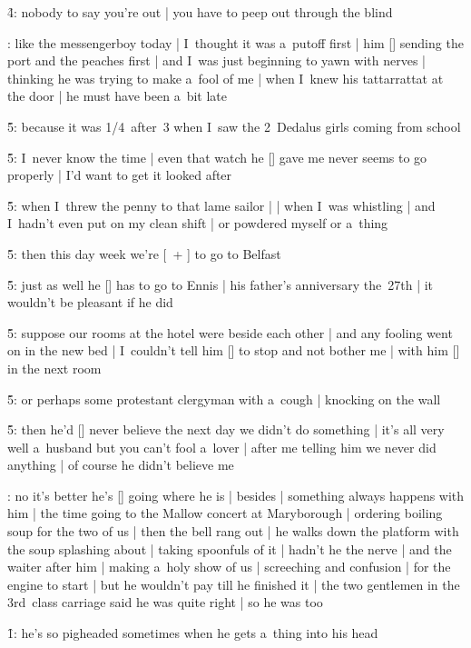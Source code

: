 \f4:
nobody to say you're out |
you have to peep out through the blind

:
like the messengerboy today |
I~thought it was a~putoff first |
him [\boylan] sending the port and the peaches first |
and I~was just beginning to yawn with nerves |
thinking he was trying to make a~fool of me |
when I~knew his tattarrattat at the door |
he must have been a~bit late

\f5:
because it was 1/4~after~3 when I~saw the 2~Dedalus girls coming from school

\f5:
I~never know the time |
even that watch he [\bloom] gave me never seems to go properly |
I'd want to get it looked after

\f5:
when I~threw the penny to that lame sailor |
 |
when I~was whistling  |
and I~hadn't even put on my clean shift |
or powdered myself or a~thing

\f5:
then this day week we're [\molly\ + \boylan] to go to Belfast

\f5:
just as well he [\bloom] has to go to Ennis |
his father's anniversary the~27th |
it wouldn't be pleasant if he did

\f5:
suppose our rooms at the hotel were beside each other |
and any fooling went on in the new bed |
I~couldn't tell him [\bloom] to stop and not bother me |
with him [\boylan] in the next room

\f5:
or perhaps some protestant clergyman with a~cough |
knocking on the wall

\f5:
then he'd [\boylan] never believe the next day we didn't do something |
it's all very well a~husband but you can't fool a~lover |
after me telling him we never did anything |
of course he didn't believe me

:
no it's better he's [\bloom] going where he is |
besides |
something always happens with him |
the time going to the Mallow concert at Maryborough |
ordering boiling soup for the two of us |
then the bell rang out |
he walks down the platform with the soup splashing about |
taking spoonfuls of it |
hadn't he the nerve |
and the waiter after him |
making a~holy show of us |
screeching and confusion |
for the engine to start |
but he wouldn't pay till he finished it |
the two gentlemen in the 3rd~class carriage said he was quite right |
so he was too

\f1:
he's so pigheaded sometimes when he gets a~thing into his head

